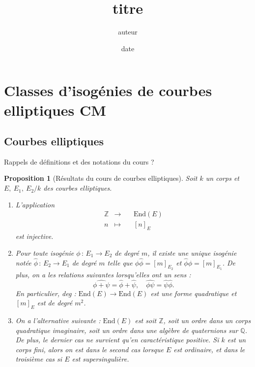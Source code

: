 \documentclass[11pt,a4paper]{article}
\title{titre}
\author{auteur}
\date{date}
\newcommand{\Z}{\mathbb{Z}}
\newcommand{\Q}{\mathbb{Q}}
\newcommand{\vers}{\rightarrow}
\newcommand{\End}{\mathrm{End}}
\newcommand{\de}{\,:\,}
\newtheorem*{prop}{Proposition}
\theoremstyle{definition}
\begin{document}
\maketitle

\newpage

\tableofcontents

\newpage

\section{Classes d'isogénies de courbes elliptiques CM}

\subsection{Courbes elliptiques}

Rappels de définitions et des notations du cours ?

\begin{prop}[Résultats du cours de courbes elliptiques]
Soit $k$ un corps et $E,\ E_1,\ E_2/k$ des courbes elliptiques. 
\begin{enumerate}

\item L'application
$$\begin{aligned}
&\Z &\longrightarrow&\ &\End(E) &\\
&n &\longmapsto& &[n]_E \ \ &
\end{aligned}$$
est injective.

\item Pour toute isogénie $\phi\de E_1\vers E_2$ de degré $m$, il existe une unique isogénie notée $\widehat{\phi}\de E_2\vers E_1$ de degré $m$ telle que $\phi\widehat{\phi}=[m]_{E_2}$ et $\widehat{\phi}\phi=[m]_{E_1}$.
De plus, on a les relations suivantes lorsqu'elles ont un sens :
$$\widehat{\phi+\psi}=\widehat{\phi}+\widehat{\psi},\quad \widehat{\phi\psi}=\widehat{\psi}\widehat{\phi}.$$
En particulier, deg : $\End(E)\vers \End(E)$ est une forme quadratique et $[m]_E$ est de degré $m^2$.

\item On a l'alternative suivante : $\End(E)$ est soit $\Z$, soit un ordre dans un corps quadratique imaginaire, soit un ordre dans une algèbre de quaternions sur $\Q$. De plus, le dernier cas ne survient qu'en caractéristique positive. Si $k$ est un corps fini, alors on est dans le second cas lorsque $E$ est ordinaire, et dans le troisième cas si $E$ est supersingulière.

\end{enumerate}
\end{prop}
\end{document}
